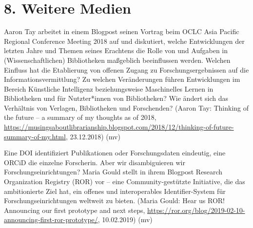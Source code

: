 \documentclass[a4paper,
fontsize=11pt,
oneside,
numbers=noperiodatend,
parskip=half-,
bibliography=totoc,
final
]{scrartcl}
\begin{document}
\hypertarget{weitere-medien}{%
\section*{8. Weitere Medien}\label{weitere-medien}}

Aaron Tay arbeitet in einem Blogpost seinen Vortrag beim OCLC Asia
Pacific Regional Conference Meeting 2018 auf und diskutiert, welche
Entwicklungen der letzten Jahre und Themen seines Erachtens die Rolle
von und Aufgaben in (Wissenschaftlichen) Bibliotheken maßgeblich
beeinflussen werden. Welchen Einfluss hat die Etablierung von offenen
Zugang zu Forschungsergebnissen auf die Informationsvermittlung? Zu
welchen Veränderungen führen Entwicklungen im Bereich Künstliche
Intelligenz beziehungsweise Maschinelles Lernen in Bibliotheken und für
Nutzter*innen von Bibliotheken? Wie ändert sich das Verhältnis von
Verlagen, Bibliotheken und Forschenden? (Aaron Tay: Thinking of the
future -- a summary of my thoughts as of 2018,
\url{https://musingsaboutlibrarianship.blogspot.com/2018/12/thinking-of-future-summary-of-my.html},
23.12.2018) (mv)

Eine DOI identifiziert Publikationen oder Forschungsdaten eindeutig,
eine ORCiD die einzelne Forscherin. Aber wir disambiguieren wir
Forschungseinrichtungen? Maria Gould stellt in ihrem Blogpost Research
Organization Registry (ROR) vor -- eine Community-gestützte Initiative,
die das ambitionierte Ziel hat, ein offenes und interoperables
Identifier-System für Forschungseinrichtungen weltweit zu bieten. (Maria
Gould: Hear us ROR! Announcing our first prototype and next steps,
\url{https://ror.org/blog/2019-02-10-announcing-first-ror-prototype/},
10.02.2019) (mv)
\end{document}
